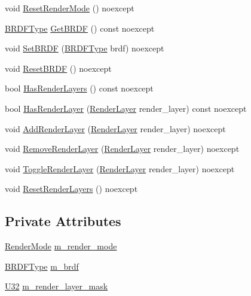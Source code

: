 \begin{DoxyCompactItemize}
\item 
void \hyperlink{classmage_1_1_camera_settings_aa8facc0ddcd3e3d9f3c05c9f44c77b5d}{Reset\+Render\+Mode} () noexcept
\item 
\hyperlink{namespacemage_ae7a7a03a7b34d7e2689689bb8295cd38}{B\+R\+D\+F\+Type} \hyperlink{classmage_1_1_camera_settings_a31504f7e9b23404ee1b200561b8dd789}{Get\+B\+R\+DF} () const noexcept
\item 
void \hyperlink{classmage_1_1_camera_settings_a8fbc3d6013d5f711decaf6f7348f2e15}{Set\+B\+R\+DF} (\hyperlink{namespacemage_ae7a7a03a7b34d7e2689689bb8295cd38}{B\+R\+D\+F\+Type} brdf) noexcept
\item 
void \hyperlink{classmage_1_1_camera_settings_a1f8b3952282d153db4fb6416e9d933b7}{Reset\+B\+R\+DF} () noexcept
\item 
bool \hyperlink{classmage_1_1_camera_settings_a838dfb8f3d32d3d23a7c72719ce182f3}{Has\+Render\+Layers} () const noexcept
\item 
bool \hyperlink{classmage_1_1_camera_settings_a5f5f7e1019db2e65cddc1a62ae30efc7}{Has\+Render\+Layer} (\hyperlink{namespacemage_a8b4a82582105b0299e2c2be5af7255d6}{Render\+Layer} render\+\_\+layer) const noexcept
\item 
void \hyperlink{classmage_1_1_camera_settings_ab1dca8b8f52daf55614592e0bb640ae9}{Add\+Render\+Layer} (\hyperlink{namespacemage_a8b4a82582105b0299e2c2be5af7255d6}{Render\+Layer} render\+\_\+layer) noexcept
\item 
void \hyperlink{classmage_1_1_camera_settings_a358ab9da30af67ca8b1ea2a5eb5a2710}{Remove\+Render\+Layer} (\hyperlink{namespacemage_a8b4a82582105b0299e2c2be5af7255d6}{Render\+Layer} render\+\_\+layer) noexcept
\item 
void \hyperlink{classmage_1_1_camera_settings_a47c34af7eddc2a0f6256d137b5813a4c}{Toggle\+Render\+Layer} (\hyperlink{namespacemage_a8b4a82582105b0299e2c2be5af7255d6}{Render\+Layer} render\+\_\+layer) noexcept
\item 
void \hyperlink{classmage_1_1_camera_settings_afc9bcdb1f27adfb1c69a668a24113b46}{Reset\+Render\+Layers} () noexcept
\end{DoxyCompactItemize}
\subsection*{Private Attributes}
\begin{DoxyCompactItemize}
\item 
\hyperlink{namespacemage_a5e7e18b0154373ce8fc942fe3f6b27fd}{Render\+Mode} \hyperlink{classmage_1_1_camera_settings_aa4d5139b4e8668c58507ead30812c84b}{m\+\_\+render\+\_\+mode}
\item 
\hyperlink{namespacemage_ae7a7a03a7b34d7e2689689bb8295cd38}{B\+R\+D\+F\+Type} \hyperlink{classmage_1_1_camera_settings_ac6a51ea7c770af79de4f97b53cab83b7}{m\+\_\+brdf}
\item 
\hyperlink{namespacemage_a41c104c036fba3756a74e19f793eeaa1}{U32} \hyperlink{classmage_1_1_camera_settings_ad27594c8dc755e0dd8ca55564a4dff8b}{m\+\_\+render\+\_\+layer\+\_\+mask}
\end{DoxyCompactItemize}


